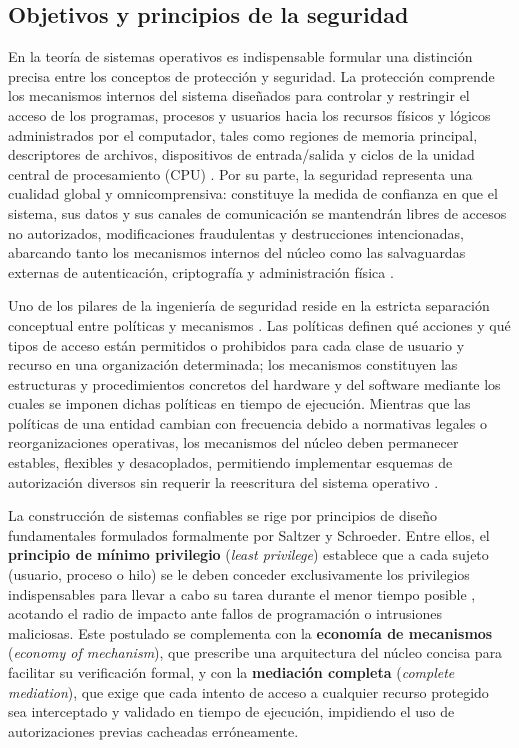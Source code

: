 \documentclass[12pt]{article}
\begin{document}
\subsection{Objetivos y principios de la seguridad}\label{subsec:objetivosPrincipiosSeguridad}

En la teoría de sistemas operativos es indispensable formular una distinción precisa entre los conceptos de protección y seguridad. La protección comprende los mecanismos internos del sistema diseñados para controlar y restringir el acceso de los programas, procesos y usuarios hacia los recursos físicos y lógicos administrados por el computador, tales como regiones de memoria principal, descriptores de archivos, dispositivos de entrada/salida y ciclos de la unidad central de procesamiento (CPU) \parencite[\S 14.1, p.\ 483]{silberschatz2006fundamentos}. Por su parte, la seguridad representa una cualidad global y omnicomprensiva: constituye la medida de confianza en que el sistema, sus datos y sus canales de comunicación se mantendrán libres de accesos no autorizados, modificaciones fraudulentas y destrucciones intencionadas, abarcando tanto los mecanismos internos del núcleo como las salvaguardas externas de autenticación, criptografía y administración física \parencite[\S 15.1, p.\ 509]{silberschatz2006fundamentos}.

Uno de los pilares de la ingeniería de seguridad reside en la estricta separación conceptual entre políticas y mecanismos \parencite[\S 14.1, p.\ 484]{silberschatz2006fundamentos}. Las políticas definen qué acciones y qué tipos de acceso están permitidos o prohibidos para cada clase de usuario y recurso en una organización determinada; los mecanismos constituyen las estructuras y procedimientos concretos del hardware y del software mediante los cuales se imponen dichas políticas en tiempo de ejecución. Mientras que las políticas de una entidad cambian con frecuencia debido a normativas legales o reorganizaciones operativas, los mecanismos del núcleo deben permanecer estables, flexibles y desacoplados, permitiendo implementar esquemas de autorización diversos sin requerir la reescritura del sistema operativo \parencite[\S 19.4.2, p.\ 888]{deitel2004operating}.

La construcción de sistemas confiables se rige por principios de diseño fundamentales formulados formalmente por Saltzer y Schroeder. Entre ellos, el \textbf{principio de mínimo privilegio} (\textit{least privilege}) establece que a cada sujeto (usuario, proceso o hilo) se le deben conceder exclusivamente los privilegios indispensables para llevar a cabo su tarea durante el menor tiempo posible \parencite[\S 14.2, p.\ 484]{silberschatz2006fundamentos}, acotando el radio de impacto ante fallos de programación o intrusiones maliciosas. Este postulado se complementa con la \textbf{economía de mecanismos} (\textit{economy of mechanism}), que prescribe una arquitectura del núcleo concisa para facilitar su verificación formal, y con la \textbf{mediación completa} (\textit{complete mediation}), que exige que cada intento de acceso a cualquier recurso protegido sea interceptado y validado en tiempo de ejecución, impidiendo el uso de autorizaciones previas cacheadas erróneamente.
\end{document}
